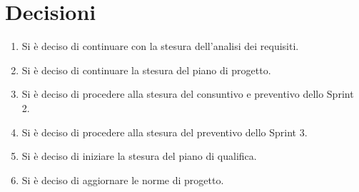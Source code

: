 \documentclass[a4paper,12pt]{article}
\begin{document}
\section{Decisioni}
\begin{enumerate}[noitemsep]
    \item Si è deciso di continuare con la stesura dell'analisi dei requisiti.
    \item Si è deciso di continuare la stesura del piano di progetto.
    \item Si è deciso di procedere alla stesura del consuntivo e preventivo dello Sprint 2.
    \item Si è deciso di procedere alla stesura del preventivo dello Sprint 3.
    \item Si è deciso di iniziare la stesura del piano di qualifica.
    \item Si è deciso di aggiornare le norme di progetto.
\end{enumerate}
\end{document}
